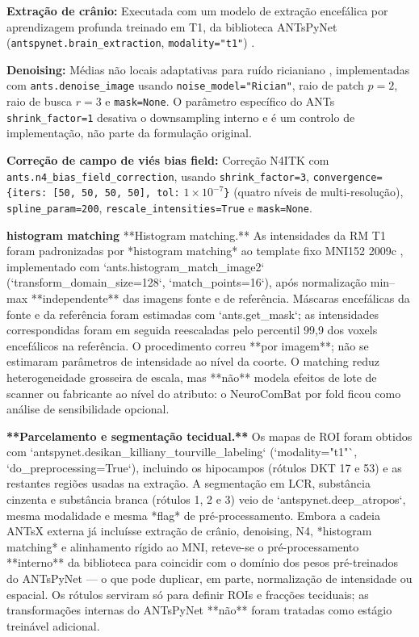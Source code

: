 \documentclass[review]{elsarticle}
\newcommand{\code}[1]{\texttt{#1}}
\begin{document}
	\textbf{Extração de crânio:} Executada com um modelo de extração encefálica por aprendizagem profunda treinado em T1, da biblioteca ANTsPyNet (\code{antspynet.brain\_extraction}, \code{modality="t1"}) \cite{tustison-2021}.
	
	\textbf{Denoising:} Médias não locais adaptativas para ruído ricianiano \cite{manjon-2010}, implementadas com \code{ants.denoise\_image} usando \code{noise\_model="Rician"}, raio de patch $p=2$, raio de busca $r=3$ e \code{mask=None}. O parâmetro específico do ANTs \code{shrink\_factor=1} desativa o downsampling interno e é um controlo de implementação, não parte da formulação original.
	
	\textbf{Correção de campo de viés bias field:} Correção N4ITK \cite{tustison-2010} com \code{ants.n4\_bias\_field\_correction}, usando \code{shrink\_factor=3}, \code{convergence=\{iters: [50, 50, 50, 50], tol:} \(1\times10^{-7}\)\code{\}} (quatro níveis de multi-resolução), \code{spline\_param=200}, \code{rescale\_intensities=True} e \code{mask=None}.
	
	\textbf{histogram matching}  **Histogram matching.** As intensidades da RM T1 foram padronizadas por *histogram matching* \cite{nyul-2000} ao template fixo MNI152 2009c \cite{fonov-2011}, implementado com `ants.histogram\_match\_image2` (`transform\_domain\_size=128`, `match\_points=16`), após normalização min--max **independente** das imagens fonte e de referência. Máscaras encefálicas da fonte e da referência foram estimadas com `ants.get\_mask`; as intensidades correspondidas foram em seguida reescaladas pelo percentil 99,9 dos voxels encefálicos na referência. O procedimento correu **por imagem**; não se estimaram parâmetros de intensidade ao nível da coorte. O matching reduz heterogeneidade grosseira de escala, mas **não** modela efeitos de lote de scanner ou fabricante ao nível do atributo: o NeuroComBat por fold \cite{fortin-2018} ficou como análise de sensibilidade opcional.
	
	\textbf{**Parcelamento e segmentação tecidual.**} Os mapas de ROI foram obtidos com `antspynet.desikan\_killiany\_tourville\_labeling` (`modality="t1"`, `do\_preprocessing=True`), incluindo os hipocampos (rótulos DKT 17 e 53) e as restantes regiões usadas na extração. A segmentação em LCR, substância cinzenta e substância branca (rótulos 1, 2 e 3) veio de `antspynet.deep\_atropos`, mesma modalidade e mesma *flag* de pré-processamento. Embora a cadeia ANTsX externa já incluísse extração de crânio, denoising, N4, *histogram matching* e alinhamento rígido ao MNI, reteve-se o pré-processamento **interno** da biblioteca para coincidir com o domínio dos pesos pré-treinados do ANTsPyNet — o que pode duplicar, em parte, normalização de intensidade ou espacial. Os rótulos serviram só para definir ROIs e fracções teciduais; as transformações internas do ANTsPyNet **não** foram tratadas como estágio treinável adicional.
	
\end{document}
